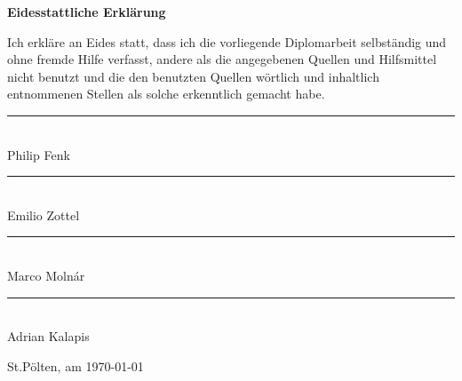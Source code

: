 \begin{flushleft}
\Large
\textbf{Eidesstattliche Erklärung\\}
\vspace{1.5cm}
\end{flushleft}


Ich erkläre an Eides statt, dass ich die vorliegende Diplomarbeit selbständig und ohne fremde Hilfe verfasst, andere als die angegebenen Quellen
und Hilfsmittel nicht benutzt und die den benutzten Quellen wörtlich und inhaltlich entnommenen Stellen als solche erkenntlich gemacht habe.

\begin{center}
	\vspace{1.5cm}
	\rule{200pt}{1pt} \\
	Philip Fenk
	
	\vspace{1.5cm}
	\rule{200pt}{1pt} \\
	Emilio Zottel

        \vspace{1.5cm}
	\rule{200pt}{1pt} \\
	Marco Molnár
	
	\vspace{1.5cm}
	\rule{200pt}{1pt} \\
	Adrian Kalapis
\end{center}

St.Pölten, am \today
